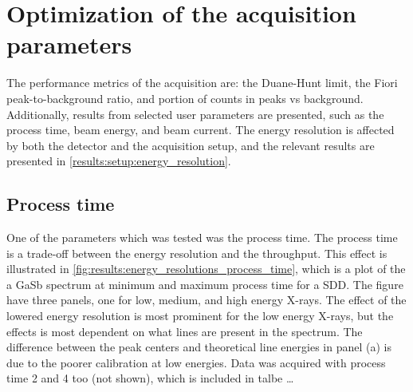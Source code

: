 


















\section{Optimization of the acquisition parameters}
\label{results:acquisition_parameters}

The performance metrics of the acquisition are: the Duane-Hunt limit, the Fiori peak-to-background ratio, and portion of counts in peaks vs background.
Additionally, results from selected user parameters are presented, such as the process time, beam energy, and beam current.
The energy resolution is affected by both the detector and the acquisition setup, and the relevant results are presented in \cref{results:setup:energy_resolution}.



\subsection{Process time}
\label{results:process_time}

One of the parameters which was tested was the process time.
The process time is a trade-off between the energy resolution and the throughput.
This effect is illustrated in \cref{fig:results:energy_resolutions_process_time}, which is a plot of the a GaSb spectrum at minimum and maximum process time for a SDD.
The figure have three panels, one for low, medium, and high energy X-rays.
The effect of the lowered energy resolution is most prominent for the low energy X-rays, but the effects is most dependent on what lines are present in the spectrum.
The difference between the peak centers and theoretical line energies in panel (a) is due to the poorer calibration at low energies.
Data was acquired with process time 2 and 4 too (not shown), which is included in talbe \dots


